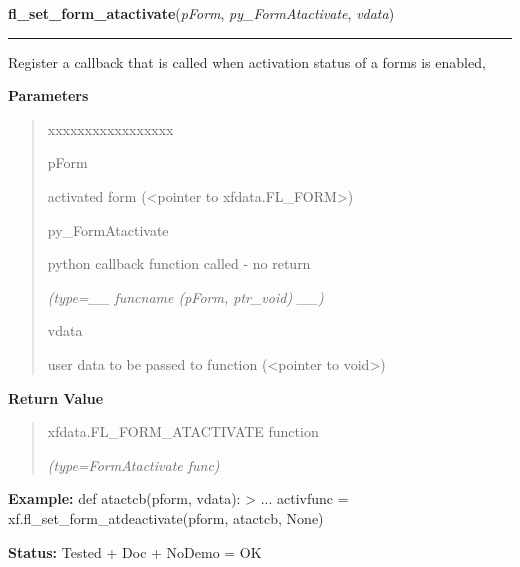     \label{xformslib:library:fl_set_form_atactivate}

    \vspace{0.5ex}

\hspace{.8\funcindent}\begin{boxedminipage}{\funcwidth}

    \raggedright \textbf{fl\_set\_form\_atactivate}(\textit{pForm}, \textit{py\_FormAtactivate}, \textit{vdata})

    \vspace{-1.5ex}

    \rule{\textwidth}{0.5\fboxrule}
\setlength{\parskip}{2ex}
    Register a callback that is called when activation status of a forms is
    enabled,

\setlength{\parskip}{1ex}
      \textbf{Parameters}
      \vspace{-1ex}

      \begin{quote}
        \begin{Ventry}{xxxxxxxxxxxxxxxxx}

          \item[pForm]

          activated form ({\textless}pointer to 
          xfdata.FL\_FORM{\textgreater})

          \item[py\_FormAtactivate]

          python callback function called - no return

            {\it (type=\_\_ funcname (pForm, ptr\_void) \_\_)}

          \item[vdata]

          user data to be passed to function ({\textless}pointer to 
          void{\textgreater})

        \end{Ventry}

      \end{quote}

      \textbf{Return Value}
    \vspace{-1ex}

      \begin{quote}
      xfdata.FL\_FORM\_ATACTIVATE function

      {\it (type=FormAtactivate func)}

      \end{quote}

\textbf{Example:} def atactcb(pform, vdata): {\textgreater} ... activfunc = 
xf.fl\_set\_form\_atdeactivate(pform, atactcb, None)



\textbf{Status:} Tested + Doc + NoDemo = OK



    \end{boxedminipage}

